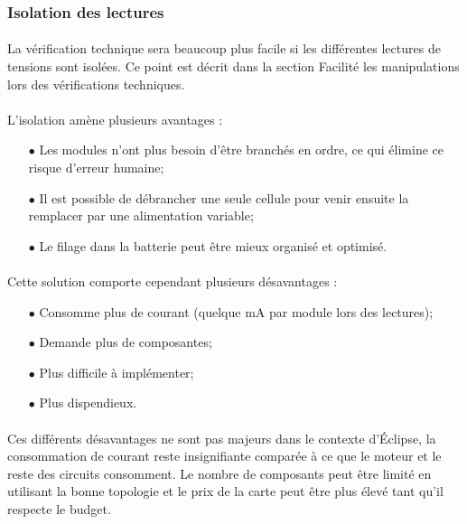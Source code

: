 	\newpage
	
	\subsubsection*{Isolation des lectures}
	\paragraph*{}
	La vérification technique sera beaucoup plus facile si les différentes lectures de tensions sont isolées. Ce point est décrit dans la section Facilité les manipulations lors des vérifications techniques. 
	
	\paragraph*{}
	L'isolation amène plusieurs avantages :
	
	\begin{itemize}
		\item[$\bullet$] Les modules n'ont plus besoin d'être branchés en ordre, ce qui élimine ce risque d'erreur humaine;
		\item[$\bullet$] Il est possible de débrancher une seule cellule pour venir ensuite la remplacer par une alimentation variable;
		\item[$\bullet$] Le filage dans la batterie peut être mieux organisé et optimisé.
	\end{itemize}

	\paragraph*{}
	Cette solution comporte cependant plusieurs désavantages :
	
	\begin{itemize}
		\item[$\bullet$] Consomme plus de courant (quelque mA par module lors des lectures);
		\item[$\bullet$] Demande plus de composantes;
		\item[$\bullet$] Plus difficile à implémenter;
		\item[$\bullet$] Plus dispendieux.
	\end{itemize}
	
	\paragraph*{}
	Ces différents désavantages ne sont pas majeurs dans le contexte d'Éclipse, la consommation de courant reste insignifiante comparée à ce que le moteur et le reste des circuits consomment. Le nombre de composants peut être limité en utilisant la bonne topologie et le prix de la carte peut être plus élevé tant qu'il respecte le budget. 
	
